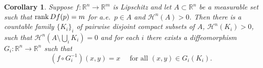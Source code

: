 \documentclass[12pt,leqno]{amsart}
\newtheorem{corollary}[theorem]{Corollary}
\theoremstyle{definition}
\newtheorem{remark}[theorem]{Remark}
\newcommand{\bbbr}{\mathbb R}
\def\H{{\mathcal H}}
\def\LL{{\mathcal L}}
\def\rank{{\rm rank\,}}
\numberwithin{theorem}{section} \numberwithin{equation}{section}
\begin{document}
\begin{corollary}
\label{6:corr1}
Suppose $f:\bbbr^n\to \bbbr^m$ is Lipschitz and let $A\subset \bbbr^n$ be a measurable set such that $\rank Df(p)=m$ for a.e.\ $p\in A$ and $\H^n(A)>0$. Then there is a countable family $\{K_i\}_i$ of pairwise disjoint compact subsets of $A$, $\H^n(K_i)>0$, such that $\H^n(A\setminus \bigcup_i K_i)=0$ and for each $i$ there exists a diffeomorphism $G_i:\bbbr^n\to\bbbr^n$ such that
\begin{equation}
\label{6:corr1 eq}
(f\circ G_i^{-1})(x,y)=x \quad \text{ for all }(x,y)\in G_i(K_i).
\end{equation}
\end{corollary}
\end{document}
